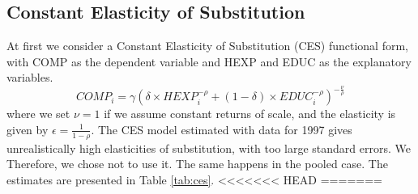 \documentclass[12pt,a4paper]{article}\usepackage[]{graphicx}\usepackage[]{color}
\begin{document}
\subsection{Constant Elasticity of Substitution}
At first we consider a Constant Elasticity of Substitution (CES) functional form, with COMP as the dependent variable and HEXP and EDUC as the explanatory variables.
\begin{equation}
COMP_i = \gamma \left( \delta \times HEXP_i^{-\rho} + (1- \delta) \times EDUC_i^{-\rho} \right)^{-\frac{\nu}{\rho}}
\end{equation}
where we set $\nu = 1$ if we assume constant returns of scale, and the elasticity is given by $\epsilon = \frac{1}{1- \rho}$. The CES model estimated with data for 1997 gives unrealistically high elasticities of substitution, with too large standard errors. We Therefore, we chose not to use it. The same happens in the pooled case. The estimates are presented in Table \ref{tab:ces}.
<<<<<<< HEAD
=======
\end{document}
